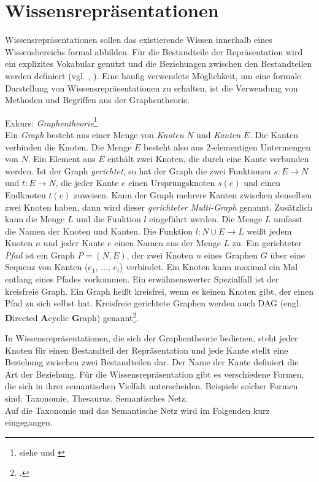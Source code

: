 \section{Wissensrepräsentationen}
\label{Ch:Vorbetrachtung:Sec:Wissensrepräsentaionen}
Wissensrepräsentationen sollen das existierende Wissen innerhalb eines Wissensbereichs formal abbilden. Für die Bestandteile der Repräsentation wird ein explizites Vokabular genutzt und die Beziehungen zwischen den Bestandteilen werden definiert (vgl. \cite[S. 60]{BEN16}, \cite[S. 1]{SEB04}). Eine häufig verwendete Möglichkeit, um eine formale Darstellung von Wissensrepräsentationen zu erhalten, ist die Verwendung von Methoden und Begriffen aus der Graphentheorie.

Exkurs: \textit{Graphentheorie}\footnote{siehe \cite[S.29]{STU09} und \cite[Abschnitte 1.1, 1.3 und 1.10]{DIE20}}\\
Ein \textit{Graph} besteht aus einer Menge von \textit{Knoten} $N$ und \textit{Kanten} $E$. Die Kanten verbinden die Knoten. Die Menge $E$ besteht also aus 2-elementigen Untermengen von $N$. Ein Element aus $E$ enthält zwei Knoten, die durch eine Kante verbunden werden. Ist der Graph \textit{gerichtet}, so hat der Graph die zwei Funktionen $s:E\rightarrow N$ und $t:E\rightarrow N$, die jeder Kante $e$ einen Ursprungsknoten $s(e)$ und einen Endknoten $t(e)$ zuweisen. Kann der Graph mehrere Kanten zwischen denselben zwei Knoten haben, dann wird dieser \textit{gerichteter Multi-Graph} genannt. Zusätzlich kann die Menge $L$ und die Funktion $l$ eingeführt werden. Die Menge $L$ umfasst die Namen der Knoten und Kanten. Die Funktion $l:N\cup E\rightarrow L$ weißt jedem Knoten $n$ und jeder Kante $e$ einen Namen aus der Menge $L$ zu.
Ein gerichteter \textit{Pfad} ist ein Graph $P = (N, E)$, der zwei Knoten $n$ eines Graphen $G$ über eine Sequenz von Kanten ($e_1$, $\dots$, $e_i$) verbindet. Ein Knoten kann maximal ein Mal entlang eines Pfades vorkommen. 
Ein erwähnenswerter Spezialfall ist der kreisfreie Graph. \glqq Ein Graph heißt kreisfrei, wenn es keinen Knoten gibt, der einen Pfad zu sich selbst hat. Kreisfreie gerichtete Graphen werden auch DAG (engl. \textbf{D}irected \textbf{A}cyclic \textbf{G}raph) genannt\grqq\footcite{STU09}. 

In Wissensrepräsentationen, die sich der Graphentheorie bedienen, steht jeder Knoten für einen Bestandteil der Repräsentation und jede Kante stellt eine Beziehung zwischen zwei Bestandteilen dar. Der Name der Kante definiert die Art der Beziehung. Für die Wissensrepräsentation gibt es verschiedene Formen, die sich in ihrer semantischen Vielfalt unterscheiden. Beispiele solcher Formen sind: Taxonomie, Thesaurus, Semantisches Netz.\\ 
Auf die Taxonomie und das Semantische Netz wird im Folgenden kurz eingegangen.
 
